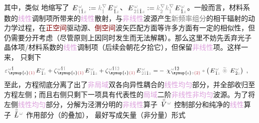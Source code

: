 其中，类似  地缩写了 $\Xint{\mathcolor{gray}{-}}{25}{E}^{\;\!\mathcolor{gray}{\omega}}_{\;\! \mathcolor{gray}{\check{1}} \hat{1} \mathcolor{gray}{z}} := \mathcolor{gray}{k^\nabla_{\check{1}}} \Xint{\mathcolor{gray}{-}}{25}{E}^{\;\!\mathcolor{gray}{\omega}}_{\;\! \hat{1} \mathcolor{gray}{z}}$、$\Xint{\mathcolor{gray}{-}}{25}{E}^{\;\!\mathcolor{gray}{\omega}}_{\;\! \mathcolor{gray}{\check{2} \check{1}} \hat{1} \mathcolor{gray}{z}} := \mathcolor{gray}{k^\nabla_{\check{2}}} \mathcolor{gray}{k^\nabla_{\check{1}}} \Xint{\mathcolor{gray}{-}}{25}{E}^{\;\!\mathcolor{gray}{\omega}}_{\;\! \hat{1} \mathcolor{gray}{z}}$。一般而言，材料系数的\textcolor{Plum}{线性}调制项所带来的\textcolor{Plum}{线性}散射，与\textcolor{Plum}{非线性}波源产生\textcolor{gray}{新频率组分}的相干辐射的动力学过程，在\textcolor{Maroon}{正空间}\textcolor{NavyBlue}{驱动源}、\textcolor{Maroon}{倒空间}\textcolor{PineGreen}{波矢}匹配方面等许多方面有一定的相似性\cite{gerkeAperiodicVolumeOptics2010,chenQuasiphasematchingdivisionMultiplexingHolography2021b}，但仍需要分开考虑（尽管原则上因同时发生而无法解耦）。那么这里不妨先丢弃光子晶体项/材料系数的\textcolor{Plum}{线性}调制项（后续会朝花夕拾它），但保留\textcolor{Plum}{非线性}项。这样一来， 只剩下
\begin{align} \label{eq:nonlinear(2)-wave_wkrho-simplify5}
	\varepsilon^{\;\! \mathcolor{gray}{\omega} \hat{1}}_{\;\! \symup{\iota} \textcolor{Maroon}{(1)}} \Xint{\mathcolor{gray}{-}}{295}{E}^{\;\!\mathcolor{gray}{\omega}}_{\;\! \hat{1} \mathcolor{gray}{z}} + \zeta^{\;\! \mathcolor{gray}{\omega} \hat{1} \mathcolor{gray}{\check{1}}}_{\;\! \symup{\iota} \textcolor{Maroon}{(1)}} \Xint{\mathcolor{gray}{-}}{295}{E}^{\;\!\mathcolor{gray}{\omega}}_{\;\! \mathcolor{gray}{\check{1}} \hat{1} \mathcolor{gray}{z}} + \zeta^{\;\! \mathcolor{gray}{\omega} \hat{1} \mathcolor{gray}{\check{1} \check{2}}}_{\;\! \symup{\iota} \textcolor{Maroon}{(1)}} \Xint{\mathcolor{gray}{-}}{295}{E}^{\;\!\mathcolor{gray}{\omega}}_{\;\! \mathcolor{gray}{\check{2} \check{1}} \hat{1} \mathcolor{gray}{z}}
	= &- \Xint{{}^{}_{\mathcolor{gray}{-}}}{23}{\chi}^{\;\! \mathcolor{gray}{\omega} \hat{1} \hat{2}}_{\;\! \symup{\iota} \mathcolor{gray}{z} \textcolor{Maroon}{(2)}} \mathcolor{gray}{*} \left( \Xint{\mathcolor{gray}{-}}{295}{E}^{\;\!\mathcolor{gray}{\omega}}_{\;\! \hat{1} \mathcolor{gray}{z}} ~\mathcolor{gray}{\widetilde \circledast}~ \Xint{\mathcolor{gray}{-}}{295}{E}^{\;\!\mathcolor{gray}{\omega}}_{\;\! \hat{2} \mathcolor{gray}{z}} \right) ~,
\end{align}
至此，方程彻底分离了出了\textcolor{Plum}{非局域}\textcolor{PineGreen}{双各向异性}耦合的\textcolor{Plum}{线性}\textcolor{Plum}{均匀}部分，并全部收归至方程左侧；而且右侧只剩下一项具有代表性的\textcolor{Plum}{局域}二阶\textcolor{Plum}{非线性}\textcolor{Plum}{非均匀}波源。为了将左侧\textcolor{Plum}{线性}\textcolor{Plum}{均匀}部分，分解为泾渭分明的\textcolor{Plum}{非线性}算子 $\Xint{\mathcolor{gray}{-}}{21}{\bar{\bar{V}}}^{\;\! \mathcolor{gray}{\omega}}$ 控制部分和纯净的\textcolor{Plum}{线性}算子 $\Xint{\mathcolor{gray}{-}}{30}{\bar{\bar{L}}}^{\;\! \mathcolor{gray}{\omega}}$ 作用部分（的叠加）， 最好写成矢量（非分量）形式
